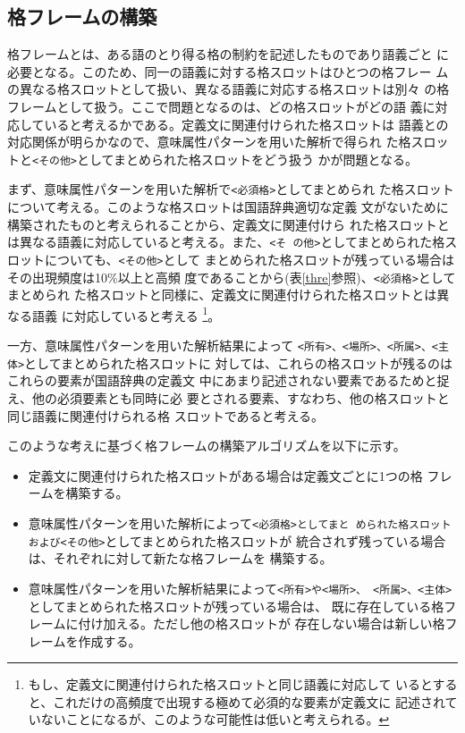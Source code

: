 \documentclass{nlp}
\begin{document}
   \subsection{格フレームの構築}
   \label{格フレームの構築}
   
   格フレームとは、ある語のとり得る格の制約を記述したものであり語義ごと
   に必要となる。このため、同一の語義に対する格スロットはひとつの格フレー
   ムの異なる格スロットとして扱い、異なる語義に対応する格スロットは別々
   の格フレームとして扱う。ここで問題となるのは、どの格スロットがどの語
   義に対応していると考えるかである。定義文に関連付けられた格スロットは
   語義との対応関係が明らかなので、意味属性パターンを用いた解析で得られ
   た格スロットと\texttt{<その他>}としてまとめられた格スロットをどう扱う
   かが問題となる。

   まず、意味属性パターンを用いた解析で\texttt{<必須格>}としてまとめられ
   た格スロットについて考える。このような格スロットは国語辞典適切な定義
   文がないために構築されたものと考えられることから、定義文に関連付けら
   れた格スロットとは異なる語義に対応していると考える。また、\texttt{<そ
   の他>}としてまとめられた格スロットについても、\texttt{<その他>}として
   まとめられた格スロットが残っている場合はその出現頻度は10\%以上と高頻
   度であることから(表\ref{thre}参照)、\texttt{<必須格>}としてまとめられ
   た格スロットと同様に、定義文に関連付けられた格スロットとは異なる語義
   に対応していると考える
   \footnote{もし、定義文に関連付けられた格スロットと同じ語義に対応して
   いるとすると、これだけの高頻度で出現する極めて必須的な要素が定義文に
   記述されていないことになるが、このような可能性は低いと考えられる。}。

   一方、意味属性パターンを用いた解析結果によって
   \texttt{<所有>、<場所>、<所属>、<主体>}としてまとめられた格スロットに
   対しては、これらの格スロットが残るのはこれらの要素が国語辞典の定義文
   中にあまり記述されない要素であるためと捉え、他の必須要素とも同時に必
   要とされる要素、すなわち、他の格スロットと同じ語義に関連付けられる格
   スロットであると考える。

   このような考えに基づく格フレームの構築アルゴリズムを以下に示す。
  \begin{itemize}
   \item 定義文に関連付けられた格スロットがある場合は定義文ごとに1つの格
	 フレームを構築する。
   \item 意味属性パターンを用いた解析によって\texttt{<必須格>としてまと
	 められた格スロットおよび<その他>}としてまとめられた格スロットが
	 統合されず残っている場合は、それぞれに対して新たな格フレームを
	 構築する。
  \item  意味属性パターンを用いた解析結果によって\texttt{<所有>や<場所>、
	 <所属>、<主体>}としてまとめられた格スロットが残っている場合は、
	 既に存在している格フレームに付け加える。ただし他の格スロットが
	 存在しない場合は新しい格フレームを作成する。
  \end{itemize}
  
\end{document}
